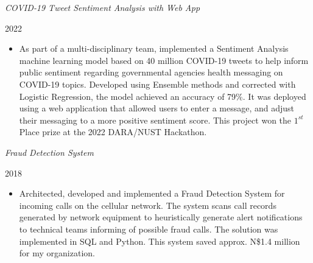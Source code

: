 \documentclass[
  letterpaper,
  DIV=11,
  numbers=noendperiod]{scrartcl}
\providecommand{\tightlist}{%
  \setlength{\itemsep}{0pt}\setlength{\parskip}{0pt}}\usepackage{longtable,booktabs,array}
\begin{document}
\vspace{5pt}

\begin{large}
  \begin{multicols}{2}
    \begin{flushleft}\textit{COVID‑19 Tweet Sentiment Analysis with Web App}\end{flushleft}
    \begin{flushright}2022\end{flushright}
  \end{multicols}
  \vspace{-0.17cm}
\end{large}

\begin{itemize}
\tightlist
\item
  As part of a multi-disciplinary team, implemented a Sentiment Analysis
  machine learning model based on 40 million COVID-19 tweets to help
  inform public sentiment regarding governmental agencies health
  messaging on COVID-19 topics. Developed using Ensemble methods and
  corrected with Logistic Regression, the model achieved an accuracy of
  79\%. It was deployed using a web application that allowed users to
  enter a message, and adjust their messaging to a more positive
  sentiment score. This project won the \(1^{st}\) Place prize at the
  2022 DARA/NUST Hackathon.
\end{itemize}

\vspace{5pt}

\begin{large}
  \begin{multicols}{2}
    \begin{flushleft}\textit{Fraud Detection System}\end{flushleft}
    \begin{flushright}2018\end{flushright}
  \end{multicols}
  \vspace{-0.17cm}
\end{large}

\begin{itemize}
\tightlist
\item
  Architected, developed and implemented a Fraud Detection System for
  incoming calls on the cellular network. The system scans call records
  generated by network equipment to heuristically generate alert
  notifications to technical teams informing of possible fraud calls.
  The solution was implemented in SQL and Python. This system saved
  approx. N\$1.4 million for my organization.
\end{itemize}
\end{document}
